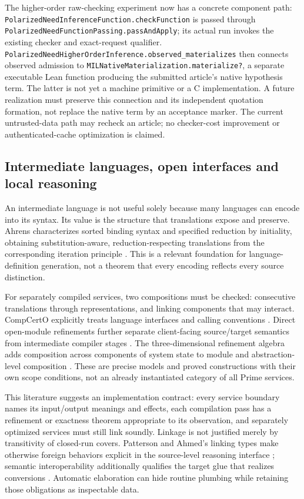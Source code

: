 \documentclass[11pt]{article}
\theoremstyle{definition}
\theoremstyle{remark}
\begin{document}
The higher-order raw-checking experiment now has a concrete component path:
\nolinkurl{PolarizedNeedInferenceFunction.checkFunction} is passed through
\nolinkurl{PolarizedNeedFunctionPassing.passAndApply}; its actual run invokes
the existing checker and exact-request qualifier.
\nolinkurl{PolarizedNeedHigherOrderInference.observed_materializes} then
connects observed admission to
\nolinkurl{MILNativeMaterialization.materialize?}, a separate executable
Lean function producing the submitted article's native hypothesis term.
The latter is not yet a machine primitive or a C implementation. A future
realization must preserve this connection and its independent quotation
formation, not replace the native term by an acceptance marker. The current
untrusted-data path may recheck an article; no checker-cost improvement or
authenticated-cache optimization is claimed.

\subsection{Intermediate languages, open interfaces and local reasoning}
\label{sec:ir-open-interfaces}

An intermediate language is not useful solely because many languages can
encode into its syntax. Its value is the structure that translations expose
and preserve. Ahrens characterizes sorted binding syntax and specified
reduction by initiality, obtaining substitution-aware, reduction-respecting
translations from the corresponding iteration principle
\cite{AhrensTypedSyntax}. This is a relevant foundation for language-definition
generation, not a theorem that every encoding reflects every source distinction.

For separately compiled services, two compositions must be checked: consecutive
translations through representations, and linking components that may interact.
CompCertO explicitly treats language interfaces and calling conventions
\cite{KoenigShaoCompCertO}. Direct open-module refinements further separate
client-facing source/target semantics from intermediate compiler stages
\cite{ZhangOpenRefinement}. The three-dimensional refinement algebra adds
composition across components of system state to module and abstraction-level
composition \cite{ZhangRefinementAlgebra}. These are precise models and proved
constructions with their own scope conditions, not an already instantiated
category of all Prime services.

This literature suggests an implementation contract: every service boundary
names its input/output meanings and effects, each compilation pass has a
refinement or exactness theorem appropriate to its observation, and separately
optimized services must still link soundly. Linkage is not justified merely
by transitivity of closed-run covers. Patterson and Ahmed's linking types
make otherwise foreign behaviors explicit in the source-level reasoning
interface \cite{PattersonAhmedLinking}; semantic interoperability additionally
qualifies the target glue that realizes conversions
\cite{PattersonSemanticInteroperability}. Automatic elaboration can hide routine
plumbing while retaining those obligations as inspectable data.
\end{document}
